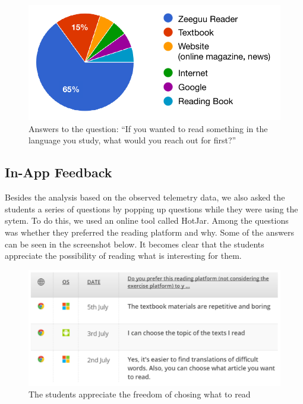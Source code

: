  \begin{figure}[h!]
    \centering
      \includegraphics[width=\columnwidth]{figures/opinions/reader_vs_textbook}
      \caption{Answers to the question: ``If you wanted to read something in the language you study, what would you reach out for first?''}
      \label{fig:preferred_reader}
    \end{figure}



\subsection{In-App Feedback}
Besides the analysis  based on the observed telemetry data, we also asked the students a series of questions by popping up questions while they were using the sytem. To do this, we used an online tool called HotJar. Among the questions was whether they preferred the reading platform and why. Some of the answers can be seen in the screenshot below. It becomes clear that the students appreciate the possibility of reading what is interesting for them.

    \begin{figure}[h!]
    \centering
      \includegraphics[width=\columnwidth]{figures/opinion_on_reading_platform}
      \caption{The students appreciate the freedom of chosing what to read}
    \end{figure}


